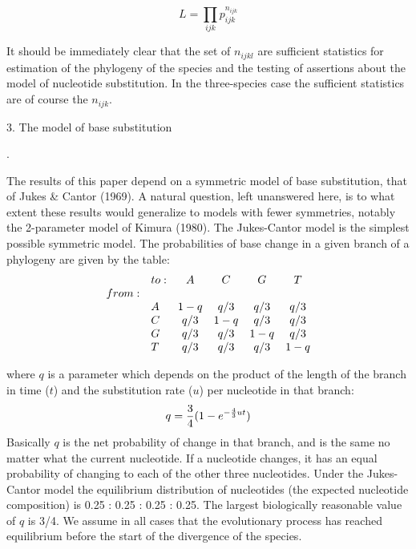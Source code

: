 \begin{equation} %
         L   =   \prod\limits_{ijk} p_{ijk}^{n_{ijk}}
\end{equation} 

It should be immediately clear that the set of $n_{ijkl}$ are sufficient 
statistics for estimation of the phylogeny of the species and the testing of 
assertions about the model of nucleotide substitution.  In the three-species 
case the sufficient statistics are of course the $n_{ijk}$.
\bigskip 


\centerline{3. The model of base substitution}.
\medskip

The results of this paper depend on a symmetric model of base
substitution, that of Jukes \& Cantor (1969).  A natural question, left
unanswered here, is to what extent these results would generalize to
models with fewer symmetries, notably the 2-parameter model of Kimura (1980).
The Jukes-Cantor model is the simplest possible symmetric model.
The probabilities of base change in a given branch of a phylogeny are given by
the table:
\begin{equation} %
\begin{array}{l l c c c c}
              &to:&  A &   C &   G &   T   \\
         from:   & \\
              &A  & 1-q & q/3 & q/3 & q/3 \\
              &C  & q/3 & 1-q & q/3 & q/3 \\
              &G  & q/3 & q/3 & 1-q & q/3 \\
              &T  & q/3 & q/3 & q/3 & 1-q
\end{array}
\end{equation}

where $q$ is a parameter which depends on the product of the length of the
branch in time ($t$) and the substitution rate ($u$) per nucleotide in that branch:
\begin{equation} %
      q   =  {3 \over 4} (1  -  e^{- {4 \over 3} u t})
\end{equation}
Basically $q$ is the net probability of change in that branch, and is the same
no matter what the current nucleotide.  If a nucleotide changes, it has an
equal probability of changing to each of the other three nucleotides.
Under the Jukes-Cantor model the equilibrium distribution of nucleotides
(the expected nucleotide composition) is 0.25 : 0.25 : 0.25 : 0.25.  The
largest biologically reasonable value of $q$ is 3/4.  We assume in all cases
that the evolutionary process has reached equilibrium before the start of the
divergence of the species.
\bigskip

